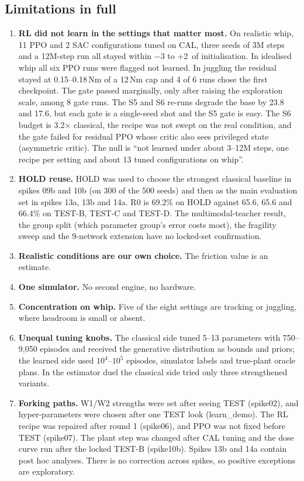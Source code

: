 \subsection*{Limitations in full}
\begin{enumerate}
\item \textbf{RL did not learn in the settings that matter most.} On realistic whip, 11 PPO and 2 SAC configurations tuned on CAL, three seeds of 3M steps and a 12M-step run all stayed within $-3$ to +2\pp\ of initialisation. In idealised whip all six PPO runs were flagged not learned. In juggling the residual stayed at 0.15--0.18\,Nm of a 12\,Nm cap and 4 of 6 runs chose the first checkpoint. The gate passed marginally, only after raising the exploration scale, among 8 gate runs. The S5 and S6 re-runs degrade the base by 23.8 and 17.6\pp, but each gate is a single-seed shot and the S5 gate is easy. The S6 budget is 3.2$\times$ classical, the recipe was not swept on the real condition, and the gate failed for residual PPO whose critic also sees privileged state (asymmetric critic). The null is ``not learned under about 3--12M steps, one recipe per setting and about 13 tuned configurations on whip''.
\item \textbf{HOLD reuse.} HOLD was used to choose the strongest classical baseline in spikes 09b and 10b (on 300 of the 500 seeds) and then as the main evaluation set in spikes 13a, 13b and 14a. R0 is 69.2\% on HOLD against 65.6, 65.6 and 66.4\% on TEST-B, TEST-C and TEST-D. The multimodal-teacher result, the group split (which parameter group's error costs most), the fragility sweep and the 9-network extension have no locked-set confirmation.
\item \textbf{Realistic conditions are our own choice.} The friction value is an estimate.
\item \textbf{One simulator.} No second engine, no hardware.
\item \textbf{Concentration on whip.} Five of the eight settings are tracking or juggling, where headroom is small or absent.
\item \textbf{Unequal tuning knobs.} The classical side tuned 5--13 parameters with 750--9{,}050 episodes and received the generative distribution as bounds and priors; the learned side used $10^4$--$10^5$ episodes, simulator labels and true-plant oracle plans. In the estimator duel the classical side tried only three strengthened variants.
\item \textbf{Forking paths.} W1/W2 strengths were set after seeing TEST (spike02), and hyper-parameters were chosen after one TEST look (learn\_demo). The RL recipe was repaired after round 1 (spike06), and PPO was not fixed before TEST (spike07). The plant step was changed after CAL tuning and the dose curve run after the locked TEST-B (spike10b). Spikes 13b and 14a contain post hoc analyses. There is no correction across spikes, so positive exceptions are exploratory.

\end{enumerate}
